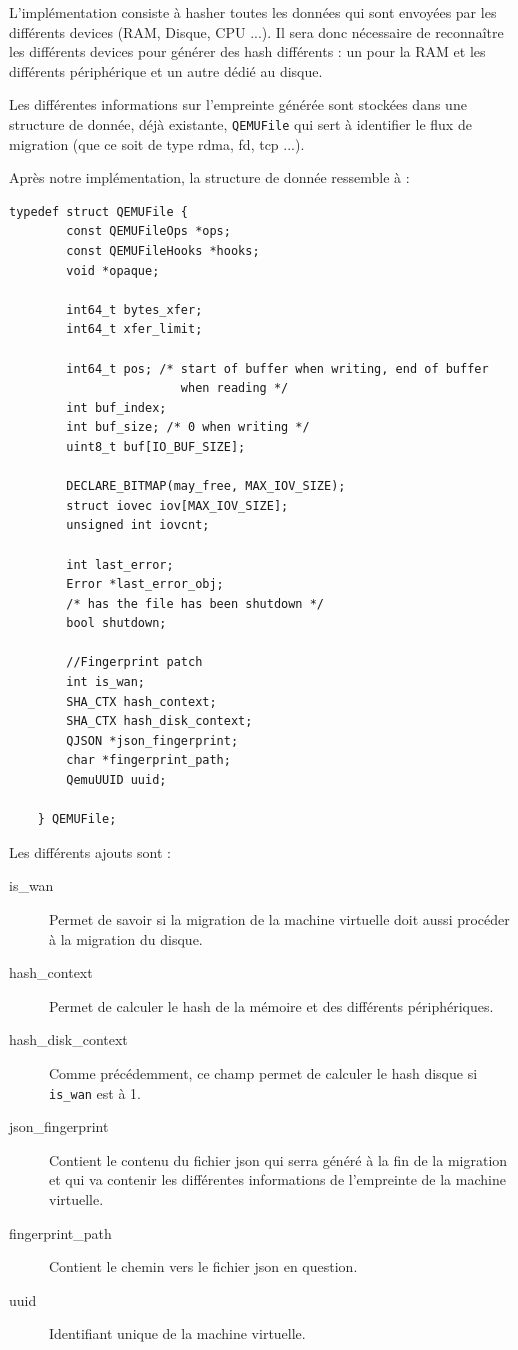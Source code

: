     L’implémentation consiste à hasher toutes les données qui sont envoyées par les différents devices (RAM, Disque, CPU ...). Il sera donc nécessaire de reconnaître les différents devices pour générer des hash différents : un pour la RAM et les différents périphérique et un autre dédié au disque.    
    
    Les différentes informations sur l'empreinte générée sont stockées dans une structure de donnée, déjà existante, \texttt{QEMUFile} qui sert à identifier le flux de migration (que ce soit de type rdma, fd, tcp ...).
    
    Après notre implémentation, la structure de donnée ressemble à :

\begin{lstlisting}[caption={Structure de donnée QEMUFile},captionpos=b]
    typedef struct QEMUFile {
        const QEMUFileOps *ops;
        const QEMUFileHooks *hooks;
        void *opaque;
    
        int64_t bytes_xfer;
        int64_t xfer_limit;
    
        int64_t pos; /* start of buffer when writing, end of buffer
                        when reading */
        int buf_index;
        int buf_size; /* 0 when writing */
        uint8_t buf[IO_BUF_SIZE];
    
        DECLARE_BITMAP(may_free, MAX_IOV_SIZE);
        struct iovec iov[MAX_IOV_SIZE];
        unsigned int iovcnt;
    
        int last_error;
        Error *last_error_obj;
        /* has the file has been shutdown */
        bool shutdown;
    
        //Fingerprint patch
        int is_wan;
        SHA_CTX hash_context;
        SHA_CTX hash_disk_context;
        QJSON *json_fingerprint;
        char *fingerprint_path;
        QemuUUID uuid;
    
    } QEMUFile;
\end{lstlisting}

Les différents ajouts sont :
\begin{description}
    \item[is\_wan] Permet de savoir si la migration de la machine virtuelle doit aussi procéder à la migration du disque.
    \item[hash\_context] Permet de calculer le hash de la mémoire et des différents périphériques.
    \item[hash\_disk\_context] Comme précédemment, ce champ permet de calculer le hash disque si \texttt{is\_wan} est à 1.
    \item[json\_fingerprint] Contient le contenu du fichier json qui serra généré à la fin de la migration et qui va contenir les différentes informations de l'empreinte de la machine virtuelle.
    \item[fingerprint\_path] Contient le chemin vers le fichier json en question.
    \item[uuid] Identifiant unique de la machine virtuelle.
\end{description}

